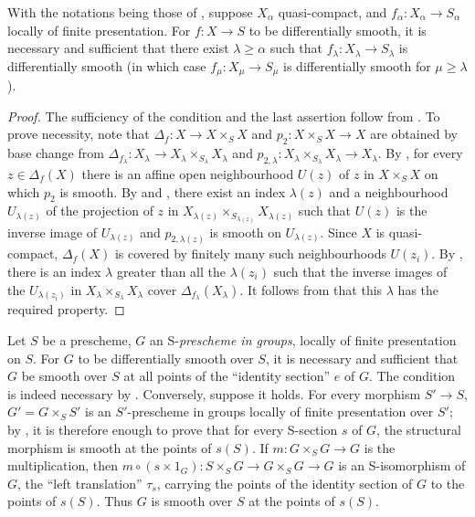 \begin{corollary}[17.12.6]
\label{IV.17.12.6}
With the notations being those of , suppose $X_\alpha$ quasi-compact, and $f_\alpha:X_\alpha\to S_\alpha$ locally of finite presentation.
For $f:X\to S$ to be differentially smooth, it is necessary and sufficient that there exist $\lambda\geq\alpha$ such that $f_\lambda:X_\lambda\to S_\lambda$ is differentially smooth (in which case $f_\mu:X_\mu\to S_\mu$ is differentially smooth for $\mu\geq\lambda$).
\end{corollary}

\begin{proof}
The sufficiency of the condition and the last assertion follow from .
To prove necessity, note that $\Delta_f:X\to X\times_SX$ and $p_2:X\times_SX\to X$ are obtained by base change from
$\Delta_{f_\lambda}:X_\lambda\to X_\lambda\times_{S_\lambda}X_\lambda$ and
$p_{2,\lambda}:X_\lambda\times_{S_\lambda}X_\lambda\to X_\lambda$.
By , for every $z\in\Delta_f(X)$ there is an affine open neighbourhood $U(z)$ of $z$ in $X\times_SX$ on which $p_2$ is smooth.
By  and , there exist an index $\lambda(z)$ and a neighbourhood $U_{\lambda(z)}$ of the projection of $z$ in
$X_{\lambda(z)}\times_{S_{\lambda(z)}}X_{\lambda(z)}$ such that $U(z)$ is the inverse image of $U_{\lambda(z)}$ and $p_{2,\lambda(z)}$ is smooth on $U_{\lambda(z)}$.
Since $X$ is quasi-compact, $\Delta_f(X)$ is covered by finitely many such neighbourhoods $U(z_i)$.
By , there is an index $\lambda$ greater than all the $\lambda(z_i)$ such that the inverse images of the $U_{\lambda(z_i)}$ in $X_\lambda\times_{S_\lambda}X_\lambda$ cover $\Delta_{f_\lambda}(X_\lambda)$.
It follows from  that this $\lambda$ has the required property.
\end{proof}

\begin{example}[17.12.7]
\label{IV.17.12.7}
Let $S$ be a prescheme, $G$ an S-\emph{prescheme in groups}, locally of finite presentation on $S$.
For $G$ to be differentially smooth over $S$, it is necessary and sufficient that $G$ be smooth over $S$ at all points of the ``identity section'' $e$ of $G$.
The condition is indeed necessary by .
Conversely, suppose it holds.
For every morphism $S'\to S$, $G'=G\times_SS'$ is an $S'$-prescheme in groups locally of finite presentation over $S'$; by , it is therefore enough to prove that for every S-section $s$ of $G$, the structural morphism is smooth at the points of $s(S)$.
If $m:G\times_SG\to G$ is the multiplication, then
$m\circ(s\times1_G):S\times_SG\to G\times_SG\to G$
is an S-isomorphism of $G$, the ``left translation'' $\tau_s$, carrying the points of the identity section of $G$ to the points of $s(S)$.
Thus $G$ is smooth over $S$ at the points of $s(S)$.
\end{example}

